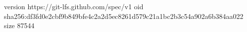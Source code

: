version https://git-lfs.github.com/spec/v1
oid sha256:df3fd0e2cbf9b849bfe4c2a2d5ec8261d579c21a1bc2b3c54a902a6b384aa022
size 87544
